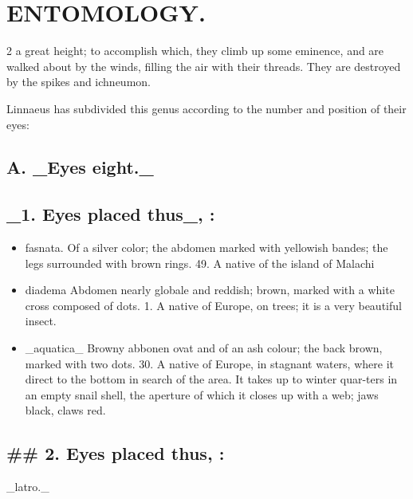 \documentclass[10pt]{article}
\begin{document}
\section*{\centering ENTOMOLOGY.}
\begin{multicols}{2}\raggedcolumns
a great height; to accomplish which, they climb up some eminence, and are walked about by the winds, filling the air with their threads. They are destroyed by the spikes and ichneumon.

Linnaeus has subdivided this genus according to the number and position of their eyes:

\subsection*{\textbf{A.} \_Eyes eight.\_}
\subsection*{\_1. Eyes placed thus\_, :}
\begin{itemize}\setlength{\itemsep}{1pt}
\item fasnata. Of a silver color; the abdomen marked with yellowish bandes; the legs surrounded with brown rings. 49. A native of the island of Malachi
\item diadema Abdomen nearly globale and reddish; brown, marked with a white cross composed of dots. 1. A native of Europe, on trees; it is a very beautiful insect.
\item \_aquatica\_ Browny abbonen ovat and of an ash colour; the back brown, marked with two dots. 30. A native of Europe, in stagnant waters, where it direct to the bottom in search of the area. It takes up to winter quar-ters in an empty snail shell, the aperture of which it closes up with a web; jaws black, claws red.
\end{itemize}
\subsection*{\#\# 2. Eyes placed thus, :}
\_latro.\_


\end{multicols}
\end{document}
